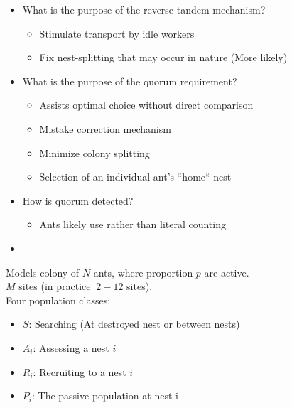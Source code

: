 \documentclass[letterpaper]{article}
\makeatletter
\def\mcolor#1#{\@mcolor{#1}}
\def\@mcolor#1#2#3{%
  \protect\leavevmode
  \begingroup
    \color#1{#2}#3%
  \endgroup
}
\newcommand{\sitem}[1]
{
    \begin{itemize}
        \item #1
    \end{itemize}
}
\makeatother
\begin{document}
      \begin{itemize}
          \item What is the purpose of the reverse-tandem mechanism?
              \sitem{Stimulate transport by idle workers}
              \sitem{Fix nest-splitting that may occur in nature (More likely)}
          \item What is the purpose of the quorum requirement?
              \sitem{Assists optimal choice without direct comparison}
              \sitem{Mistake correction mechanism}
              \sitem{Minimize colony splitting}
              \sitem{Selection of an individual ant's ``home`` nest}
          \item How is quorum detected?
              \sitem{Ants likely use  rather than literal counting}
          \item {}
      \end{itemize}

      Models colony of $N$ ants, where proportion $p$ are active. \\
      $M$ sites (in practice $~2-12$ sites). \\
      Four population classes: 
      \begin{itemize}
          \item $S$: Searching (At destroyed nest or between nests) 
          \item $A_i$: Assessing a nest $i$ 
          \item $R_i$: Recruiting to a nest $i$ 
          \item $P_i$: The passive population at nest i 
      \end{itemize}
\end{document}
